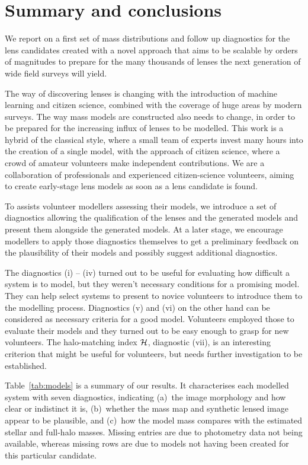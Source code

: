 \section{Summary and conclusions}\label{sec:summary}


We report on a first set of mass distributions and follow up diagnostics for 
the {\SW} lens candidates created with a novel approach that aims to be scalable 
by orders of magnitudes to prepare for the many thousands of lenses the next 
generation of wide field surveys will yield.

The way of discovering lenses is changing with the introduction of
machine learning and citizen science, combined with the coverage of
huge areas by modern surveys.  The way mass models are constructed also needs to
change, in order to be prepared for the increasing influx of lenses to
be modelled.  This work is a hybrid of the classical style, where a
small team of experts invest many hours into the creation of a single
model, with the approach of citizen science, where a crowd of amateur
volunteers make independent contributions.  We are a collaboration of
professionals and experienced citizen-science volunteers, aiming to
create early-stage lens models as soon as a lens candidate is found.

To assists volunteer modellers assessing their models, we introduce a
set of diagnostics allowing the qualification of the lenses and the
generated models and present them alongside the generated models. At a
later stage, we encourage modellers to apply those diagnostics
themselves to get a preliminary feedback on the plausibility of their
models and possibly suggest additional diagnostics.

The diagnostics (i) -- (iv) turned out to be useful for evaluating how difficult a system is to model, but they weren't necessary conditions for a promising model.
They can help select systems to present to novice volunteers to introduce them to the modelling process.
Diagnostics (v) and (vi) on the other hand can be considered as necessary criteria for a good model.
Volunteers employed those to evaluate their models and they turned out to be easy enough to grasp for new volunteers.
The halo-matching index $\mathcal{H}$, diagnostic (vii), is an interesting criterion that might be useful for volunteers, but needs further investigation to be established.


Table~\ref{tab:models} is a summary of our results.  It characterises
each modelled system with seven diagnostics, indicating (a)~the image
morphology and how clear or indistinct it is, (b)~whether the mass map
and synthetic lensed image appear to be plausible, and (c)~how the
model mass compares with the estimated stellar and full-halo masses.
Missing entries are due to photometry data not being available, whereas
missing rows are due to models not having been created for this particular
candidate.

